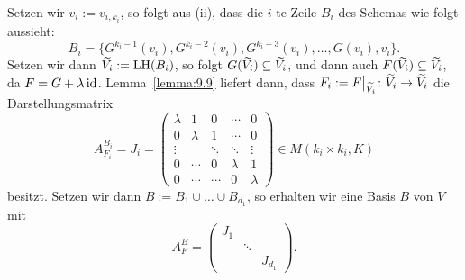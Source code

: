 \begin{beweis}
	Setzen wir $v_i := v_{i,k_i}$, so folgt aus (ii), dass die $i$-te Zeile $B_i$ des Schemas wie folgt aussieht:
	\[
		B_i = \{G^{k_i-1}(v_i), G^{k_i-2}(v_i), G^{k_i-3}(v_i),\dots,G(v_i),v_i\}.
	\]
	Setzen wir dann $\widetilde{V_i} := \operatorname{LH}(B_i)$, so folgt $G(\widetilde{V_i}) \subseteq \widetilde{V_i}$, und dann auch $F(\widetilde{V_i}) \subseteq \widetilde{V_i}$, da $F = G + \lambda \operatorname{id}$.
	Lemma~\ref{lemma:9.9} liefert dann, dass $F_i := F\big|_{\widetilde{V_i}} \colon \widetilde{V_i} \rightarrow \widetilde{V_i}$ die Darstellungsmatrix
	\[
		A_{F_i}^{B_i} = J_i = \begin{pmatrix}
		\lambda & 1 & 0 & \cdots & 0 \\ 
		0 & \lambda & 1 & \cdots & 0 \\ 
		\vdots &  & \ddots & \ddots & \vdots \\ 
		0 & \cdots & 0 & \lambda & 1 \\ 
		0 & \cdots & \cdots & 0 & \lambda
		\end{pmatrix} \in M(k_i \times k_i,K)
	\]
	besitzt.
	Setzen wir dann $B := B_1 \cup \dots \cup B_{d_1}$, so erhalten wir eine Basis $B$ von $V$ mit
	\[
	A_F^B = \begin{pmatrix}
	J_1 & & \\
	& \ddots & \\
	& & J_{d_1}
	\end{pmatrix}. 
	\]
\end{beweis}


